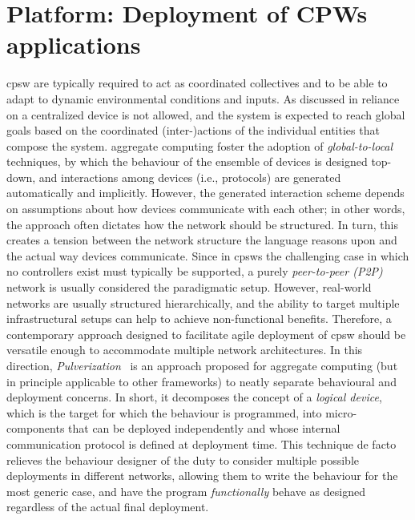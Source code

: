 \chapter{Platform: Deployment of CPWs applications}\label{chap:eng:multitier}%
\minitoc%
%
\newcommand{\scalaloci}{{ScalaLoci}}
\newcommand{\scafiloci}{{ScaFiLoci}}
\newcommand{\scalainline}[1]{\texttt{#1}}
\ac{cpsw} are typically required 
 to act as coordinated collectives
 and to be able to adapt to dynamic
 environmental conditions and inputs.
%
%
As discussed in  reliance on a centralized device is not allowed,
and the system is expected to reach global goals based 
 on the coordinated (inter-)actions of the individual entities that compose the system.
aggregate computing foster the adoption of \emph{global-to-local} techniques,
by which the behaviour of the ensemble of devices is designed top-down,
and interactions among devices (i.e., protocols) are generated automatically and implicitly.
%
However, the generated interaction scheme depends on assumptions about how devices communicate with each other;
in other words, the approach often dictates how the network should be structured.
%
In turn, this creates a tension between the network structure the language reasons upon and the actual way devices communicate.
%
Since in \acp{cpsw} the challenging case in which no controllers exist must typically be supported, 
 a purely \emph{peer-to-peer (P2P)} network is usually considered the paradigmatic setup.
%
However, real-world networks are usually structured hierarchically, 
 and the ability to target multiple infrastructural setups can help to achieve non-functional benefits.
%
Therefore, a contemporary approach designed to facilitate agile deployment of \ac{cpsw} should be versatile enough to accommodate multiple network architectures.
In this direction, \emph{Pulverization}~\cite{DBLP:journals/fi/CasadeiPPVW20}
 is an approach proposed for aggregate computing 
 (but in principle applicable to other frameworks) 
 to neatly separate behavioural and deployment concerns.
%
In short, it decomposes the concept of a \emph{logical device}, 
 which is the target for which the behaviour is programmed,
 into micro-components that can be deployed independently
 and whose internal communication protocol is defined at deployment time.
%
This technique de facto relieves the behaviour designer of the duty 
 to consider multiple possible  deployments in different networks, 
 allowing them to write the behaviour for the most generic case, 
 and have the program \emph{functionally} behave as designed regardless of the actual final deployment.

